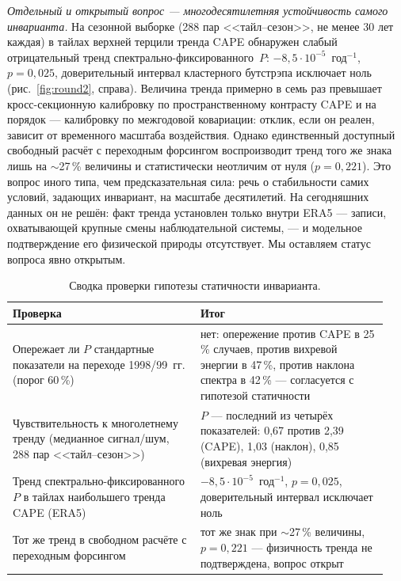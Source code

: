 \documentclass[11pt,a4paper]{article}
\begin{document}
\emph{Отдельный и открытый вопрос --- многодесятилетняя устойчивость самого инварианта.} На сезонной выборке (288 пар <<тайл--сезон>>, не менее 30 лет каждая) в тайлах верхней терцили тренда CAPE обнаружен слабый отрицательный тренд спектрально-фиксированного~$P$: $-8{,}5\cdot10^{-5}$~год$^{-1}$, $p=0{,}025$, доверительный интервал кластерного бутстрэпа исключает ноль (рис.~\ref{fig:round2}, справа). Величина тренда примерно в семь раз превышает кросс-секционную калибровку по пространственному контрасту CAPE и на порядок --- калибровку по межгодовой ковариации: отклик, если он реален, зависит от временного масштаба воздействия. Однако единственный доступный свободный расчёт с переходным форсингом воспроизводит тренд того же знака лишь на $\sim$27\,\% величины и статистически неотличим от нуля ($p=0{,}221$). Это вопрос иного типа, чем предсказательная сила: речь о стабильности самих условий, задающих инвариант, на масштабе десятилетий. На сегодняшних данных он не решён: факт тренда установлен только внутри ERA5 --- записи, охватывающей крупные смены наблюдательной системы, --- и модельное подтверждение его физической природы отсутствует. Мы оставляем статус вопроса явно открытым.

\begin{table}[t]
\centering
\caption{Сводка проверки гипотезы статичности инварианта.}
\label{tab:static}
\small
\begin{tabular}{@{}p{0.47\linewidth}p{0.47\linewidth}@{}}
\toprule
Проверка & Итог\\
\midrule
Опережает ли $P$ стандартные показатели на переходе 1998/99~гг. (порог 60\,\%) & нет: опережение против CAPE в 25\,\% случаев, против вихревой энергии в 47\,\%, против наклона спектра в 42\,\% --- согласуется с гипотезой статичности\\
Чувствительность к многолетнему тренду (медианное сигнал/шум, 288 пар <<тайл--сезон>>) & $P$ --- последний из четырёх показателей: 0,67 против 2,39 (CAPE), 1,03 (наклон), 0,85 (вихревая энергия)\\
Тренд спектрально-фиксированного $P$ в тайлах наибольшего тренда CAPE (ERA5) & $-8{,}5\cdot10^{-5}$~год$^{-1}$, $p=0{,}025$, доверительный интервал исключает ноль\\
Тот же тренд в свободном расчёте с переходным форсингом & тот же знак при $\sim$27\,\% величины, $p=0{,}221$ --- физичность тренда не подтверждена, вопрос открыт\\
\bottomrule
\end{tabular}
\end{table}
\end{document}
